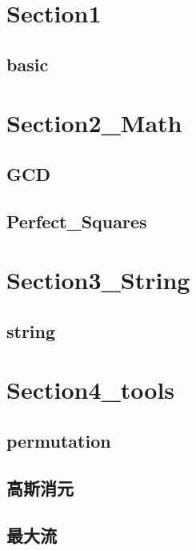 \section{Section1}
    \subsection{basic}
        
        
\section{Section2_Math}
    \subsection{GCD}
        
    \subsection{Perfect_Squares}
        

\section{Section3_String}
    \subsection{string}
        

\section{Section4_tools}
    \subsection{permutation}
        
    \subsection{高斯消元}
        
    \subsection{最大流}
        

